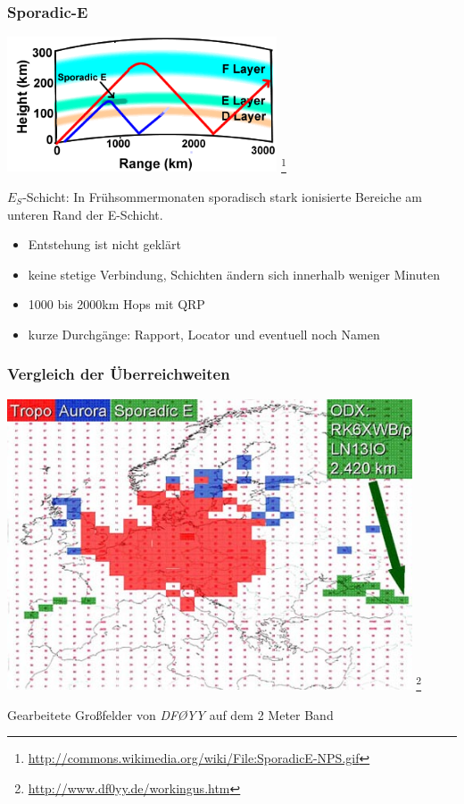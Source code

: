 \begin{frame}
    \frametitle{Sporadic-E}

    \begin{center}
        \includegraphics[width=0.6\textwidth,height=.4\textheight,keepaspectratio]{bv11/SporadicE-NPS.png}
        \footnote{\tiny \url{http://commons.wikimedia.org/wiki/File:SporadicE-NPS.gif}}
    \end{center}

    $E_S$-Schicht: In Frühsommermonaten sporadisch stark ionisierte Bereiche am
    unteren Rand der E-Schicht.

    \begin{itemize}
        \item Entstehung ist nicht geklärt
        \item keine stetige Verbindung, Schichten ändern sich innerhalb weniger Minuten
        \item 1000 bis 2000km Hops mit QRP
        \item kurze Durchgänge: Rapport, Locator und eventuell noch Namen
    \end{itemize}

\end{frame}

\begin{frame}
    \frametitle{Vergleich der Überreichweiten}

    \begin{center}
        \includegraphics[width=0.9\textwidth,height=.75\textheight,keepaspectratio]{bv11/df0yy_2m-karte.jpg}
        \footnote{\tiny \url{http://www.df0yy.de/workingus.htm}}

        Gearbeitete Großfelder von \emph{DFØYY} auf dem 2 Meter Band
    \end{center}

\end{frame}

